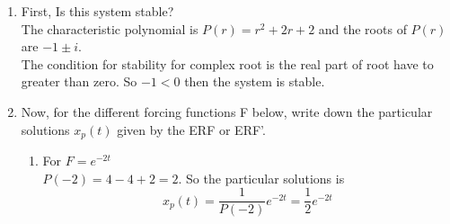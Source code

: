 \begin{enumerate}
\item First, Is this system stable?\\

  The characteristic polynomial is $P(r) = r^2 + 2r + 2$ and the roots of
  $P(r)$ are $-1 \pm i$. \\
  The condition for stability for complex root is the real part of root have to
  greater than zero. So $-1 < 0$ then the system is stable.

\item Now, for the different forcing functions F below,
  write down the particular solutions $x_p(t)$ given by the ERF or ERF'.
  \begin{enumerate}[label=(\alph*)]
  \item For $F = e^{-2t}$\\
    $P(-2) = 4 -4 +2 = 2$. So the particular solutions is
    \begin{equation*}
      x_p(t) = \frac{1}{P(-2)} e^{-2t} = \frac{1}{2} e^{-2t} 
    \end{equation*}
    

\end{enumerate}
\end{enumerate}
